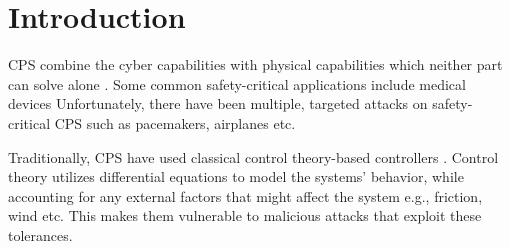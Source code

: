 
\chapter{Introduction }
\label{ch:Chapter1}
\ac{CPS} combine the cyber capabilities with physical capabilities which neither part can solve alone \cite{Platzer18}. %
Some common safety-critical applications include medical devices \cite{10.1145/2038642.2038667} \cite{6051465} \cite{10.1145/2461328.2461369} \cite{Bresolin2015} %
Unfortunately, there have been multiple, targeted attacks on safety-critical CPS such as pacemakers\cite{4531149}, airplanes \cite{217595} etc.  %


Traditionally, CPS have used classical control theory-based controllers  \cite{1337806} \cite{10.1145/2038642.2038667} \cite{6051465}. Control theory utilizes differential equations to model the systems' behavior, while accounting for any external factors that might affect the system e.g., friction, wind etc. This makes them vulnerable to malicious attacks that exploit these tolerances.
%

